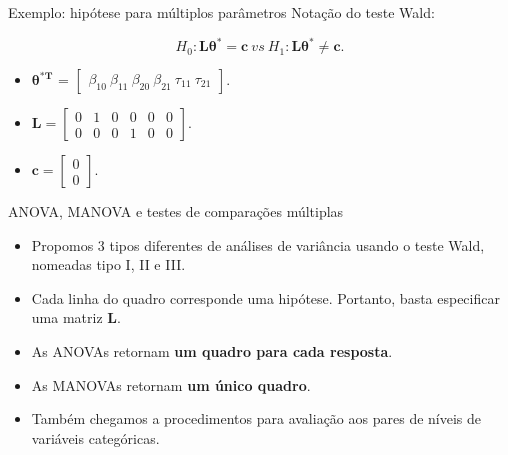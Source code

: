 \documentclass[
  ignorenonframetext,
  serif,
  professionalfont,
  usenames,
  dvipsnames,
  aspectratio = 169]{beamer}
\begin{document}
\begin{frame}{Exemplo: hipótese para múltiplos parâmetros}
\protect\hypertarget{exemplo-hipuxf3tese-para-muxfaltiplos-paruxe2metros-1}{}
Notação do teste Wald:

\[H_0: \boldsymbol{L}\boldsymbol{\theta^{*}} = \boldsymbol{c} \ vs \ H_1: \boldsymbol{L}\boldsymbol{\theta^{*}} \neq \boldsymbol{c}.\]

\begin{itemize}
  
    \item $\boldsymbol{\theta^{*T}}$ = $\begin{bmatrix} \beta_{10} \  \beta_{11} \ \beta_{20} \ \beta_{21} \ \tau_{11} \ \tau_{21} \end{bmatrix}$.

    \item $\boldsymbol{L} = \begin{bmatrix} 0 & 1 & 0 & 0 & 0 & 0 \\
0 & 0 & 0 & 1 & 0 & 0 \end{bmatrix}.$
 
  \item $\boldsymbol{c} = \begin{bmatrix} 0 \\ 0 \end{bmatrix}.$

  \end{itemize}
\end{frame}

\begin{frame}{ANOVA, MANOVA e testes de comparações múltiplas}
\protect\hypertarget{anova-manova-e-testes-de-comparauxe7uxf5es-muxfaltiplas-1}{}
\begin{itemize}
    \itemsep 2ex
    
  \item Propomos 3 tipos diferentes de análises de variância usando o teste Wald, nomeadas tipo I, II e III.

  \item Cada linha do quadro corresponde uma hipótese. Portanto, basta especificar uma matriz $\boldsymbol{L}$.

  \item As ANOVAs retornam \textbf{um quadro para cada resposta}.

  \item As MANOVAs retornam \textbf{um único quadro}. 

  \item Também chegamos a procedimentos para avaliação aos pares de níveis de variáveis categóricas.

\end{itemize}
\end{frame}
\end{document}
